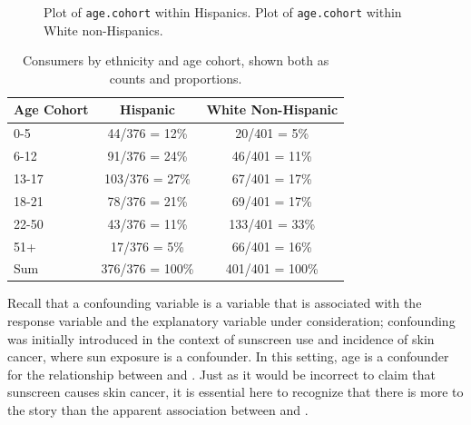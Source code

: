 \begin{figure}[ht]
	\centering
	\caption{ Plot of \texttt{age.cohort} within Hispanics.  Plot of \texttt{age.cohort} within White non-Hispanics.}
	\label{ddsAgeCohortPlots}
\end{figure}

\begin{table}[ht]
	\centering
	\begin{tabular}{l|c|c}
		\hline
		Age Cohort & Hispanic & White Non-Hispanic \\ 
		\hline
		0-5 & 44/376 = 12\% & 20/401 = 5\% \\ 
		6-12 & 91/376 = 24\% & 46/401 = 11\% \\ 
		13-17 & 103/376 = 27\% & 67/401 = 17\% \\
		18-21 & 78/376 = 21\% & 69/401 = 17\% \\
		22-50 & 43/376 = 11\% & 133/401 = 33\% \\
		51+ & 17/376 = 5\% & 66/401 = 16\% \\
		\hline
		Sum & 376/376 = 100\% & 401/401 = 100\% \\ 
		\hline
	\end{tabular}
	\caption{Consumers by ethnicity and age cohort, shown both as counts and proportions.}
	\label{ddsEthAgeTable}
\end{table}

Recall that a confounding variable is a variable that is associated with the response variable and the explanatory variable under consideration; confounding was initially introduced in the context of sunscreen use and incidence of skin cancer, where sun exposure is a confounder. In this setting, age is a confounder for the relationship between  and . Just as it would be incorrect to claim that sunscreen causes skin cancer, it is essential here to recognize that there is more to the story than the apparent association between  and .

